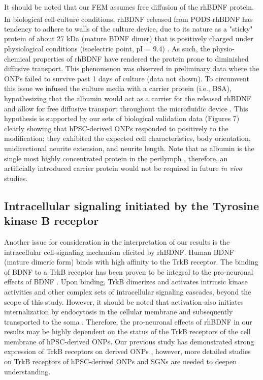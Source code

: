 \documentclass[review]{elsarticle}
\begin{document}
\indent It should be noted that our FEM assumes free diffusion of the rhBDNF protein. In biological cell-culture conditions, rhBDNF released from PODS\textsuperscript{\textregistered}-rhBDNF has tendency to adhere to walls of the culture device, due to its nature as a "sticky" protein of about 27 kDa (mature BDNF dimer) that is positively charged under physiological conditions (isoelectric point, pI = 9.4) \cite{Sasi2017}. As such, the physio-chemical properties of rhBDNF have rendered the protein prone to diminished diffusive transport. This phenomenon was observed in preliminary data where the ONPs failed to survive past 1 days of culture (data not shown). To circumvent this issue we infused the culture media with a carrier protein (i.e., BSA), hypothesizing that the albumin would act as a carrier for the released rhBDNF and allow for free diffusive transport throughout the microfluidic device \cite{Li2010}. This hypothesis is supported by our sets of biological validation data (Figures 7) clearly showing that hPSC-derived ONPs responded to positively to the modification; they exhibited the expected cell characteristics, body orientation, unidirectional neurite extension, and neurite length. Note that as albumin is the single most highly concentrated protein in the perilymph \cite{Swan2009}, therefore, an artificially introduced carrier protein would not be required in future \textit{in vivo} studies.  

\subsection{Intracellular signaling initiated by the Tyrosine kinase B receptor}
Another issue for consideration in the interpretation of our results is the intracellular cell-signaling mechanism elicited by rhBDNF. Human BDNF (mature dimeric form) binds with high affinity to the TrkB receptor. The binding of BDNF to a TrkB receptor has been proven to be integral to the pro-neuronal effects of BDNF \cite{green2012}. Upon binding, TrkB dimerizes and activates intrinsic kinase activities and other complex sets of intracellular signaling cascades, beyond the scope of this study. However, it should be noted that activation also initiates internalization by endocytosis in the cellular membrane and subsequently transported to the soma \cite{Numakawa2010}. Therefore, the pro-neuronal effects of rhBDNF in our results may be highly dependent on the status of the TrkB receptors of the cell membrane of hPSC-derived ONPs. Our previous study has demonstrated strong expression of TrkB receptors on derived ONPs \cite{Matsuoka2017}, however, more detailed studies on TrkB receptors of hPSC-derived ONPs and SGNs are needed to deepen understanding.
\end{document}
